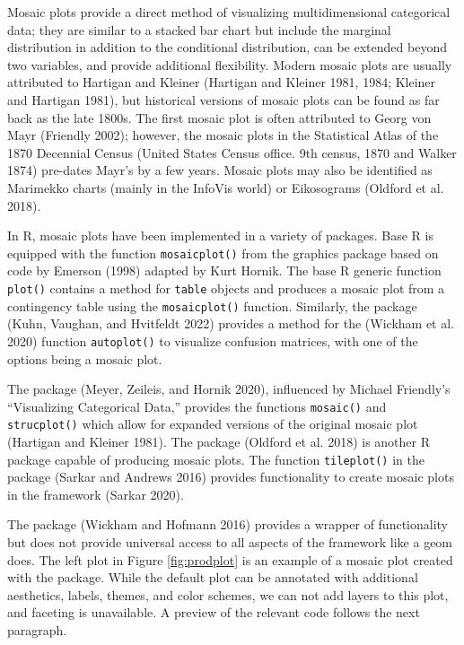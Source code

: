 Mosaic plots provide a direct method of visualizing multidimensional categorical data; they are similar to a stacked bar chart but include the marginal distribution in addition to the conditional distribution, can be extended beyond two variables, and provide additional flexibility. Modern mosaic plots are usually attributed to Hartigan and Kleiner (Hartigan and Kleiner 1981, 1984; Kleiner and Hartigan 1981), but historical versions of mosaic plots can be found as far back as the late 1800s. The first mosaic plot is often attributed to Georg von Mayr (Friendly 2002); however, the mosaic plots in the Statistical Atlas of the 1870 Decennial Census (United States Census office. 9th census, 1870 and Walker 1874) pre-dates Mayr's by a few years. Mosaic plots may also be identified as Marimekko charts (mainly in the InfoVis world) or Eikosograms (Oldford et al. 2018).

In R, mosaic plots have been implemented in a variety of packages. Base R is equipped with the function \texttt{mosaicplot()} from the graphics package based on code by Emerson (1998) adapted by Kurt Hornik. The base R generic function \texttt{plot()} contains a method for \texttt{table} objects and produces a mosaic plot from a contingency table using the \texttt{mosaicplot()} function. Similarly, the  package (Kuhn, Vaughan, and Hvitfeldt 2022) provides a method for the  (Wickham et al. 2020) function \texttt{autoplot()} to visualize confusion matrices, with one of the options being a mosaic plot.

The  package (Meyer, Zeileis, and Hornik 2020), influenced by Michael Friendly's ``Visualizing Categorical Data,'' provides the functions \texttt{mosaic()} and \texttt{strucplot()} which allow for expanded versions of the original mosaic plot (Hartigan and Kleiner 1981). The  package (Oldford et al. 2018) is another R package capable of producing mosaic plots. The function \texttt{tileplot()} in the  package (Sarkar and Andrews 2016) provides functionality to create mosaic plots in the  framework (Sarkar 2020).

The  package (Wickham and Hofmann 2016) provides a wrapper of  functionality but does not provide universal access to all aspects of the  framework like a geom does. The left plot in Figure \ref{fig:prodplot} is an example of a mosaic plot created with the  package. While the default plot can be annotated with additional aesthetics, labels, themes, and color schemes, we can not add layers to this plot, and faceting is unavailable. A preview of the relevant code follows the next paragraph.

